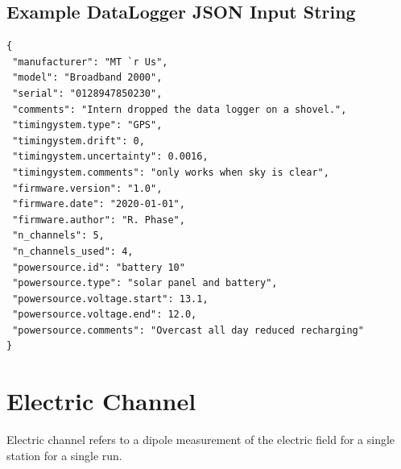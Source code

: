 \documentclass{article}
\begin{document}
\newpage
\subsection{Example DataLogger JSON Input String}

\begin{verbatim}
{
 "manufacturer": "MT `r Us",
 "model": "Broadband 2000",
 "serial": "0128947850230",
 "comments": "Intern dropped the data logger on a shovel.",
 "timingystem.type": "GPS",
 "timingystem.drift": 0,
 "timingystem.uncertainty": 0.0016,
 "timingystem.comments": "only works when sky is clear",
 "firmware.version": "1.0",
 "firmware.date": "2020-01-01",
 "firmware.author": "R. Phase",
 "n_channels": 5,
 "n_channels_used": 4,
 "powersource.id": "battery 10"
 "powersource.type": "solar panel and battery",
 "powersource.voltage.start": 13.1,
 "powersource.voltage.end": 12.0,
 "powersource.comments": "Overcast all day reduced recharging"
}
\end{verbatim}

\newpage
\section{Electric Channel}

Electric channel refers to a dipole measurement of the electric field for a single station for a single run.   
 
\end{document}
